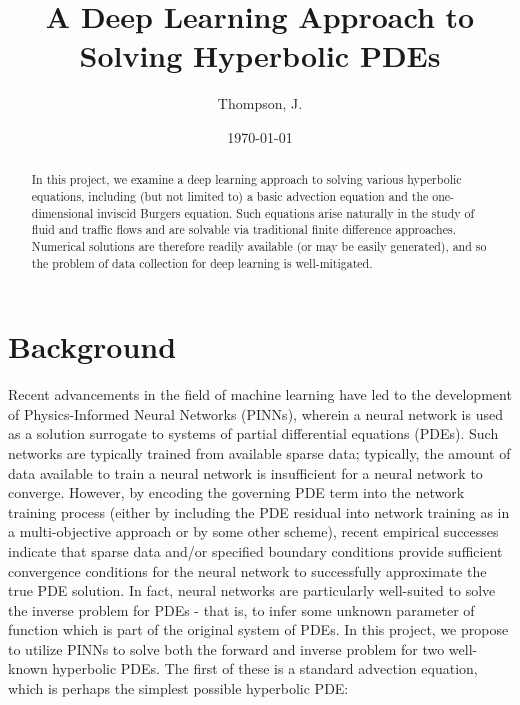 \documentclass[letterpaper,12pt]{article}
\begin{document}
    \title{
        A Deep Learning Approach to Solving Hyperbolic PDEs\\
    }
    \author{%
        Thompson, J.
    }
    \date{\today}
    \maketitle

    \begin{abstract}
        In this project, we examine a deep learning approach to solving various hyperbolic equations, including 
        (but not limited to) a basic advection equation and the one-dimensional inviscid Burgers equation.
        Such equations arise naturally in the study of fluid and traffic flows and are solvable via traditional 
        finite difference approaches. Numerical solutions are therefore readily available (or may be easily generated),
        and so the problem of data collection for deep learning is well-mitigated.
    \end{abstract}


    \section{Background}\label{sec:background}
    Recent advancements in the field of machine learning have led to the development of Physics-Informed Neural 
    Networks (PINNs), wherein a neural network is used as a solution surrogate to systems of partial differential 
    equations (PDEs). Such networks are typically trained from available sparse data; typically, the amount of data
    available to train a neural network is insufficient for a neural network to converge. However, by encoding the 
    governing PDE term into the network training process (either by including the PDE residual into network training as
    in a multi-objective approach or by some other scheme), recent empirical successes indicate that
    sparse data and/or specified boundary conditions provide sufficient convergence conditions for the neural network to
    successfully approximate the true PDE solution.\cite{raissi_physics-informed_2019} In fact, neural networks are 
    particularly well-suited to solve the inverse problem for PDEs - that is, to infer some unknown parameter of 
    function which is part of the original system of PDEs.\cite{lu_deepxde_2021} In this project, we propose to utilize
    PINNs to solve both the forward and inverse problem for two well-known hyperbolic PDEs. The first of these is a 
    standard advection equation, which is perhaps the simplest possible hyperbolic PDE:
\end{document}
